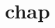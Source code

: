 \documentclass{book}
\newcommand{\Texinfothechapterheading}{}
\newcommand{\Texinfoheadingchaptername}{\chaptername}
\newcommand{\Texinfochapter}[1]{\chapter{#1}
\renewcommand{\Texinfothechapterheading}{\Texinfoheadingchaptername{} \thechapter{} }%
}%
\renewcommand{\_}{\Texinfounderscore\discretionary{}{}{}}
\begin{document}
\label{anchor:Top}%
\Texinfochapter{{chap}}
\label{anchor:First}%
\end{document}
